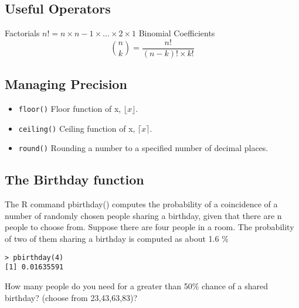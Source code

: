 \documentclass[a4paper,12pt]{article}
\begin{document}
\subsection{Useful Operators}

Factorials
$n! = n \times n-1 \times \ldots \times 2 \times 1 $
Binomial Coefficients
\[ { n \choose k }  = \frac{n!}{(n-k)! \times k!}\]
\subsection{Managing Precision}

\begin{itemize}
\item \texttt{floor()} Floor function of x, $\lfloor x \rfloor$.
\item \texttt{ceiling()} Ceiling function of x, $\lceil x \rceil$.
\item \texttt{round()} Rounding a number to a specified number of decimal places.
\end{itemize}
\subsection{The Birthday function}
The R command pbirthday() computes the probability of a coincidence of a number of randomly chosen people sharing a birthday, given that there are n people to choose from.
Suppose there are four people in a room. The probability of two of them sharing a birthday is computed as about 1.6 \%
\begin{verbatim}
> pbirthday(4)
[1] 0.01635591
\end{verbatim}

How many people do you need for a greater than 50\% chance of a shared birthday? (choose from 23,43,63,83)?
\end{document}
